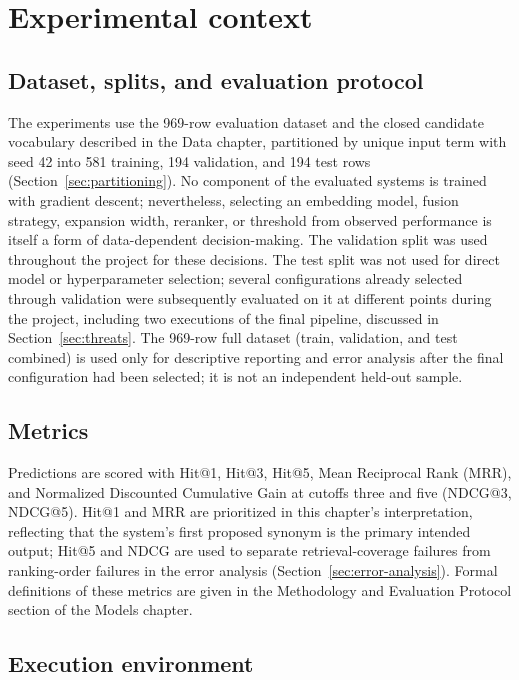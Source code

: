 \section{Experimental context}

\subsection{Dataset, splits, and evaluation protocol}

The experiments use the 969-row evaluation dataset and the closed candidate vocabulary described in the Data chapter, partitioned by unique input term with seed 42 into 581 training, 194 validation, and 194 test rows (Section~\ref{sec:partitioning}). No component of the evaluated systems is trained with gradient descent; nevertheless, selecting an embedding model, fusion strategy, expansion width, reranker, or threshold from observed performance is itself a form of data-dependent decision-making. The validation split was used throughout the project for these decisions. The test split was not used for direct model or hyperparameter selection; several configurations already selected through validation were subsequently evaluated on it at different points during the project, including two executions of the final pipeline, discussed in Section~\ref{sec:threats}. The 969-row full dataset (train, validation, and test combined) is used only for descriptive reporting and error analysis after the final configuration had been selected; it is not an independent held-out sample.

\subsection{Metrics}

Predictions are scored with Hit@1, Hit@3, Hit@5, Mean Reciprocal Rank (MRR), and Normalized Discounted Cumulative Gain at cutoffs three and five (NDCG@3, NDCG@5). Hit@1 and MRR are prioritized in this chapter's interpretation, reflecting that the system's first proposed synonym is the primary intended output; Hit@5 and NDCG are used to separate retrieval-coverage failures from ranking-order failures in the error analysis (Section~\ref{sec:error-analysis}). Formal definitions of these metrics are given in the Methodology and Evaluation Protocol section of the Models chapter.

\subsection{Execution environment}

